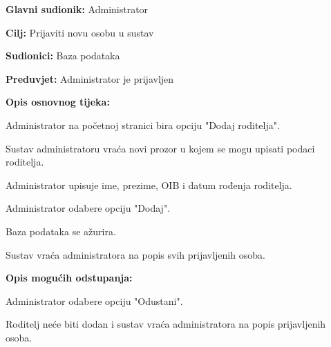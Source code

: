 					
					\noindent {}
					\begin{packed_item}
						
						\item \textbf{Glavni sudionik: }Administrator
						\item  \textbf{Cilj:} Prijaviti novu osobu u sustav
						\item  \textbf{Sudionici:} Baza podataka
						\item  \textbf{Preduvjet:} Administrator je prijavljen
						\item  \textbf{Opis osnovnog tijeka:}
						
						\item[] \begin{packed_enum}
							
							\item Administrator na početnoj stranici bira opciju "Dodaj roditelja".
							\item Sustav administratoru vraća novi prozor u kojem se mogu upisati podaci roditelja.
							\item Administrator upisuje ime, prezime, OIB i datum rođenja roditelja.
							\item Administrator odabere opciju "Dodaj".
							\item Baza podataka se ažurira.
							\item Sustav vraća administratora na popis svih prijavljenih osoba.
						\end{packed_enum}
						
						\item  \textbf{Opis mogućih odstupanja:}
						
						\item[] \begin{packed_item}
							
							\item[4.a] Administrator odabere opciju "Odustani".
							\item[] \begin{packed_enum}
								
								\item Roditelj neće biti dodan i sustav vraća administratora na popis prijavljenih osoba.
							\end{packed_enum}
							
							
						\end{packed_item}
						
						
					\end{packed_item}
					
